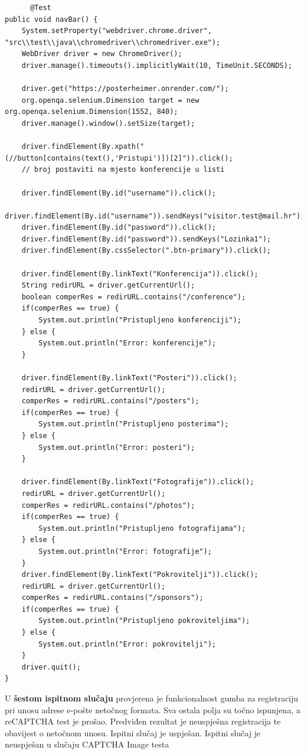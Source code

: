 	\begin{lstlisting}
	  @Test
public void navBar() {
	System.setProperty("webdriver.chrome.driver", "src\\test\\java\\chromedriver\\chromedriver.exe");
	WebDriver driver = new ChromeDriver();
	driver.manage().timeouts().implicitlyWait(10, TimeUnit.SECONDS);	
	
	driver.get("https://posterheimer.onrender.com/");
	org.openqa.selenium.Dimension target = new  org.openqa.selenium.Dimension(1552, 840);
	driver.manage().window().setSize(target);
	
	driver.findElement(By.xpath("(//button[contains(text(),'Pristupi')])[2]")).click();
	// broj postaviti na mjesto konferencije u listi
	
	driver.findElement(By.id("username")).click();
	driver.findElement(By.id("username")).sendKeys("visitor.test@mail.hr");
	driver.findElement(By.id("password")).click();
	driver.findElement(By.id("password")).sendKeys("Lozinka1");
	driver.findElement(By.cssSelector(".btn-primary")).click();
	
	driver.findElement(By.linkText("Konferencija")).click();
	String redirURL = driver.getCurrentUrl();
	boolean comperRes = redirURL.contains("/conference");
	if(comperRes == true) {
		System.out.println("Pristupljeno konferenciji");
	} else {
		System.out.println("Error: konferencije");
	}
	
	driver.findElement(By.linkText("Posteri")).click();
	redirURL = driver.getCurrentUrl();
	comperRes = redirURL.contains("/posters");
	if(comperRes == true) {
		System.out.println("Pristupljeno posterima");
	} else {
		System.out.println("Error: posteri");
	}
	
	driver.findElement(By.linkText("Fotografije")).click();
	redirURL = driver.getCurrentUrl();
	comperRes = redirURL.contains("/photos");
	if(comperRes == true) {
		System.out.println("Pristupljeno fotografijama");
	} else {
		System.out.println("Error: fotografije");
	}
	driver.findElement(By.linkText("Pokrovitelji")).click();
	redirURL = driver.getCurrentUrl();
	comperRes = redirURL.contains("/sponsors");
	if(comperRes == true) {
		System.out.println("Pristupljeno pokroviteljima");
	} else {
		System.out.println("Error: pokrovitelji");
	}
	driver.quit();
}
	\end{lstlisting}
	
	U \textbf{šestom ispitnom slučaju} provjerena je funkcionalnost gumba za registraciju pri unosu adrese e-pošte netočnog formata. Sva ostala polja su točno ispunjena, a reCAPTCHA test je prošao. Predviđen rezultat je neuspješna registracija te obavijest o netočnom unosu. Ispitni slučaj je uspješan.
	Ispitni slučaj je neuspješan u slučaju CAPTCHA Image testa 

